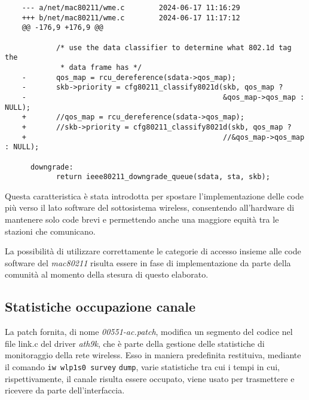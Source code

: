\begin{lstlisting}
    --- a/net/mac80211/wme.c        2024-06-17 11:16:29
    +++ b/net/mac80211/wme.c        2024-06-17 11:17:12
    @@ -176,9 +176,9 @@
     
            /* use the data classifier to determine what 802.1d tag the
             * data frame has */
    -       qos_map = rcu_dereference(sdata->qos_map);
    -       skb->priority = cfg80211_classify8021d(skb, qos_map ?
    -                                              &qos_map->qos_map : NULL);
    +       //qos_map = rcu_dereference(sdata->qos_map);
    +       //skb->priority = cfg80211_classify8021d(skb, qos_map ?
    +                                              //&qos_map->qos_map : NULL);
     
      downgrade:
            return ieee80211_downgrade_queue(sdata, sta, skb);
\end{lstlisting}
Questa caratteristica è stata introdotta per spostare l'implementazione delle code più verso il lato software del sottosistema wireless, consentendo all'hardware di mantenere solo code brevi e permettendo anche una maggiore equità tra le stazioni che comunicano.

La possibilità di utilizzare correttamente le categorie di accesso insieme alle code software del \textit{mac80211} risulta essere in fase di implementazione da parte della comunità al momento della stesura di questo elaborato.

\subsection[Statistiche occupazione canale]{Statistiche occupazione canale}
La patch fornita, di nome \textit{00551-ac.patch}, modifica un segmento del codice nel file link.c del driver \textit{ath9k}, che è parte della gestione delle statistiche di monitoraggio della rete wireless. Esso in maniera predefinita restituiva, mediante il comando \verb|iw wlp1s0 survey| \verb|dump|, varie statistiche tra cui i tempi in cui, rispettivamente, il canale risulta essere occupato, viene usato per trasmettere e ricevere da parte dell'interfaccia. 

